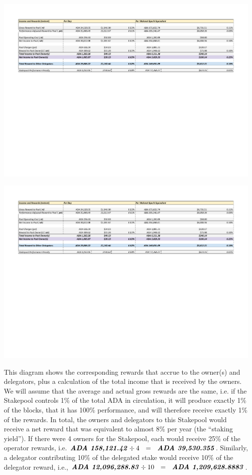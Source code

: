 \documentclass[11pt,a4paper,dvipsnames,twosided,final]{article}
\newcommand{\ada}{ADA{}}
\newcommand{\ADA}[1]{\textbf{\emph{\ada~{#1}}}}
\begin{document}
\hspace{-0.65in}\begin{minipage}{\textwidth}
  \includegraphics[width=1.2\textwidth]{RCT4.pdf}
\vspace{-3.8in}

\includegraphics[width=1.2\textwidth]{RCT4.pdf}
\vspace{-3in}
\end{minipage}

\noindent
This diagram shows the corresponding rewards that accrue to the owner(s) and delegators,
plus a calculation of the total income that is received by the owners.  We will assume that the average
and actual gross rewards are the same, i.e. if the Stakepool controls 1\% of the total \ada{} in
circulation, it will produce exactly 1\% of the blocks, that it has 100\% performance, and will therefore receive exactly 1\% of the rewards.
In total, the
owners and delegators to this Stakepool would receive a net reward that was equivalent to almost 8\% per year
(the ``staking yield'').  If there were 4 owners for the Stakepool, each would receive
25\% of the operator rewards, i.e. $\ADA{158,121.42} \div 4 ~~=~~ \ADA{39,530.355}$.
Similarly, a delegator contributing 10\% of the delegated stake would receive 10\% of
the delegator reward, i.e., $\ADA{12,096,288.83} \div 10 ~~=~~ \ADA{1,209,628.8883}$.
\end{document}
